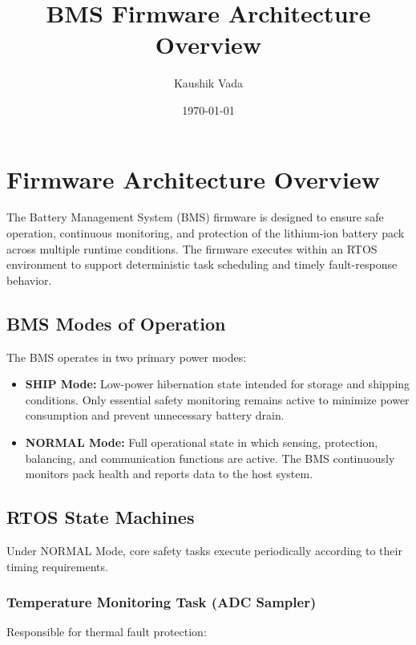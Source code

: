\documentclass[12pt]{article}
\title{BMS Firmware Architecture Overview}
\author{Kaushik Vada}
\date{\today}
\begin{document}
\maketitle

\section{Firmware Architecture Overview}

The Battery Management System (BMS) firmware is designed to ensure safe operation, continuous monitoring, and protection of the lithium-ion battery pack across multiple runtime conditions. The firmware executes within an RTOS environment to support deterministic task scheduling and timely fault-response behavior.

\subsection{BMS Modes of Operation}

The BMS operates in two primary power modes:

\begin{itemize}
    \item \textbf{SHIP Mode:} Low-power hibernation state intended for storage and shipping conditions. Only essential safety monitoring remains active to minimize power consumption and prevent unnecessary battery drain.
    \item \textbf{NORMAL Mode:} Full operational state in which sensing, protection, balancing, and communication functions are active. The BMS continuously monitors pack health and reports data to the host system.
\end{itemize}

\subsection{RTOS State Machines}

Under NORMAL Mode, core safety tasks execute periodically according to their timing requirements.

\subsubsection{Temperature Monitoring Task (ADC Sampler)}

Responsible for thermal fault protection:
\end{document}
